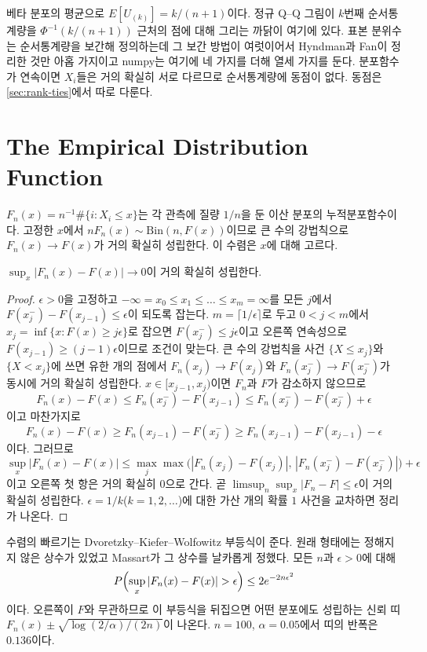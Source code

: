베타 분포의 평균으로 $E[U_{(k)}]=k/(n+1)$이다. 정규 Q--Q 그림이 $k$번째 순서통계량을 $\Phi^{-1}(k/(n+1))$ 근처의 점에 대해 그리는 까닭이 여기에 있다. 표본 분위수는 순서통계량을 보간해 정의하는데 그 보간 방법이 여럿이어서 Hyndman과 Fan이 정리한 것만 아홉 가지이고 numpy는 여기에 네 가지를 더해 열세 가지를 둔다. 분포함수가 연속이면 $X_i$들은 거의 확실히 서로 다르므로 순서통계량에 동점이 없다. 동점은 \cref{sec:rank-ties}에서 따로 다룬다.

\section{The Empirical Distribution Function}
\label{sec:empirical-cdf}

 $F_n(x)=n^{-1}\#\{i:X_i\le x\}$는 각 관측에 질량 $1/n$을 둔 이산 분포의 누적분포함수이다. 고정한 $x$에서 $nF_n(x)\sim\mathrm{Bin}(n,F(x))$이므로 큰 수의 강법칙으로 $F_n(x)\to F(x)$가 거의 확실히 성립한다. 이 수렴은 $x$에 대해 고르다.

\begin{theorem}
\label{thm:glivenko-cantelli}
$\sup_x|F_n(x)-F(x)|\to0$이 거의 확실히 성립한다.
\end{theorem}

\begin{proof}
$\epsilon>0$을 고정하고 $-\infty=x_0\le x_1\le\dots\le x_m=\infty$를 모든 $j$에서 $F(x_j^-)-F(x_{j-1})\le\epsilon$이 되도록 잡는다. $m=\lceil1/\epsilon\rceil$로 두고 $0<j<m$에서 $x_j=\inf\{x:F(x)\ge j\epsilon\}$로 잡으면 $F(x_j^-)\le j\epsilon$이고 오른쪽 연속성으로 $F(x_{j-1})\ge(j-1)\epsilon$이므로 조건이 맞는다. 큰 수의 강법칙을 사건 $\{X\le x_j\}$와 $\{X<x_j\}$에 쓰면 유한 개의 점에서 $F_n(x_j)\to F(x_j)$와 $F_n(x_j^-)\to F(x_j^-)$가 동시에 거의 확실히 성립한다. $x\in[x_{j-1},x_j)$이면 $F_n$과 $F$가 감소하지 않으므로
\[
F_n(x)-F(x)\le F_n(x_j^-)-F(x_{j-1})\le F_n(x_j^-)-F(x_j^-)+\epsilon
\]
이고 마찬가지로
\[
F_n(x)-F(x)\ge F_n(x_{j-1})-F(x_j^-)\ge F_n(x_{j-1})-F(x_{j-1})-\epsilon
\]
이다. 그러므로
\[
\sup_x|F_n(x)-F(x)|\le\max_j\max\bigl(|F_n(x_j)-F(x_j)|,\,|F_n(x_j^-)-F(x_j^-)|\bigr)+\epsilon
\]
이고 오른쪽 첫 항은 거의 확실히 $0$으로 간다. 곧 $\limsup_n\sup_x|F_n-F|\le\epsilon$이 거의 확실히 성립한다. $\epsilon=1/k$($k=1,2,\dots$)에 대한 가산 개의 확률 $1$ 사건을 교차하면 정리가 나온다.
\end{proof}

수렴의 빠르기는 Dvoretzky--Kiefer--Wolfowitz 부등식이 준다. 원래 형태\cite{dvoretzky1956}에는 정해지지 않은 상수가 있었고 Massart가 그 상수를 날카롭게 정했다\cite{massart1990}. 모든 $n$과 $\epsilon>0$에 대해
\begin{equation}
\label{eq:dkw}
P\Bigl(\sup_x|F_n(x)-F(x)|>\epsilon\Bigr)\le2e^{-2n\epsilon^2}
\end{equation}
이다. 오른쪽이 $F$와 무관하므로 이 부등식을 뒤집으면 어떤 분포에도 성립하는 신뢰 띠 $F_n(x)\pm\sqrt{\log(2/\alpha)/(2n)}$이 나온다. $n=100$, $\alpha=0.05$에서 띠의 반폭은 $0.136$이다.

